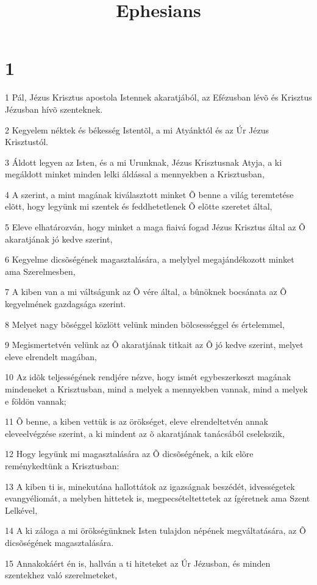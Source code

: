 

\title{Ephesians}


\chapter{1}

\par 1 Pál, Jézus Krisztus apostola Istennek akaratjából, az Efézusban lévõ és Krisztus Jézusban hívõ szenteknek.
\par 2 Kegyelem néktek és békesség Istentõl, a mi Atyánktól és az Úr Jézus Krisztustól.
\par 3 Áldott legyen az Isten, és a mi Urunknak, Jézus Krisztusnak Atyja, a ki megáldott minket minden lelki áldással a mennyekben a Krisztusban,
\par 4 A szerint, a mint magának kiválasztott minket Õ benne a világ teremtetése elõtt, hogy legyünk mi szentek és feddhetetlenek Õ elõtte szeretet által,
\par 5 Eleve elhatározván, hogy minket a maga fiaivá fogad Jézus Krisztus által az Õ akaratjának jó kedve szerint,
\par 6 Kegyelme dicsõségének magasztalására, a melylyel megajándékozott minket ama Szerelmesben,
\par 7 A kiben van a mi váltságunk az Õ vére által, a bûnöknek bocsánata az Õ kegyelmének gazdagsága szerint.
\par 8 Melyet nagy bõséggel közlött velünk minden bölcsességgel és értelemmel,
\par 9 Megismertetvén velünk az Õ akaratjának titkait az Õ jó kedve szerint, melyet eleve elrendelt magában,
\par 10 Az idõk teljességének rendjére nézve, hogy ismét egybeszerkeszt magának mindeneket a Krisztusban, mind a melyek a mennyekben vannak, mind a melyek e földön vannak;
\par 11 Õ benne, a kiben vettük is az örökséget, eleve elrendeltetvén annak eleveelvégzése szerint, a ki mindent az õ akaratjának tanácsából cselekszik,
\par 12 Hogy legyünk mi magasztalására az Õ dicsõségének, a kik elõre reménykedtünk a Krisztusban:
\par 13 A kiben ti is, minekutána hallottátok az igazságnak beszédét, idvességetek evangyéliomát, a melyben hittetek is, megpecsételtettetek az ígéretnek ama Szent Lelkével,
\par 14 A ki záloga a mi örökségünknek Isten tulajdon népének megváltatására, az Õ dicsõségének magasztalására.
\par 15 Annakokáért én is, hallván a ti hiteteket az Úr Jézusban, és minden szentekhez való szerelmeteket,
